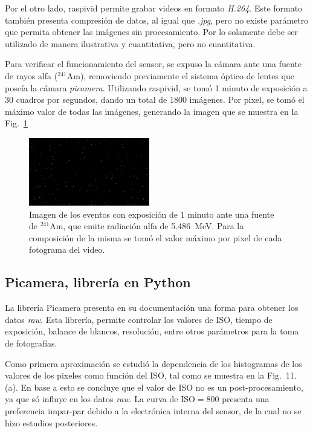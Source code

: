 \documentclass[twoside,twocolumn]{article}
\begin{document}
    Por el otro lado, raspivid permite grabar videos en formato \emph{H.264}.
    Este formato también presenta compresión de datos, al igual que \emph{.jpg},
    pero no existe parámetro que permita obtener las imágenes sin procesamiento.
    Por lo solamente debe ser utilizado de manera ilustrativa y cuantitativa, pero no cuantitativa.

    Para verificar el funcionamiento del sensor, se expuso la cámara ante una fuente de rayos alfa ($^{241}$Am),
    removiendo previamente el sistema óptico de lentes que poseía la cámara \emph{picamera}.
    Utilizando raspivid, se tomó 1 minuto de exposición a 30 cuadros por segundos, dando un total de 1800 imágenes.
    Por pixel, se tomó el máximo valor de todas las imágenes, generando la imagen que se muestra en la Fig.~\ref{fig:raspivid}

    \begin{figure}[h]
      \includegraphics[width=0.47\textwidth]{figures/Alpha_1m.png}
      \caption{Imagen de los eventos con exposición de 1 minuto ante una fuente de $^{241}$Am,
      que emite radiación alfa de \SI{5.486}{\mega\eV}.
      Para la composición de la misma se tomó el valor máximo por pixel de cada fotograma del video.
      }
      \label{fig:raspivid}
    \end{figure}

  \subsection*{Picamera, librería en Python}%
    La librería Picamera presenta en su documentación una forma para obtener los datos \emph{raw}\cite{picamera}.
    Esta librería, permite controlar los valores de ISO, tiempo de exposición,
    balance de blancos, resolución, entre otros parámetros para la toma de fotografías.

    Como primera aproximación se estudió la dependencia de los histogramas de los valores de los pixeles
    como función del ISO, tal como se muestra en la Fig.~11.(a).
    En base a esto se concluye que el valor de ISO no es un post-procesamiento, ya que só influye en los datos \emph{raw}.
    La curva de ISO$=800$ presenta una preferencia impar-par debido a la electrónica interna del sensor,
    de la cual no se hizo estudios posteriores.
\end{document}
